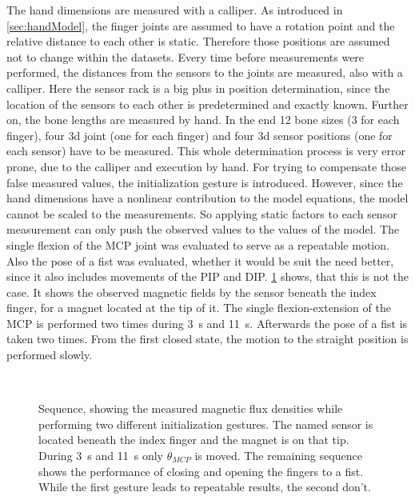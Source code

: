 The hand dimensions are measured with a calliper. As introduced in \ref{sec:handModel}, the finger joints are assumed to have a rotation point and the relative distance to each other is static. Therefore those positions are assumed not to change within the datasets. Every time before measurements were performed, the distances from the sensors to the joints are measured, also with a calliper. Here the sensor rack is a big plus in position determination, since the location of the sensors to each other is predetermined and exactly known. Further on, the bone lengths are measured by hand. In the end 12 bone sizes (3 for each finger), four 3d joint (one for each finger) and four 3d sensor positions (one for each sensor) have to be measured. This whole determination process is very error prone, due to the calliper and execution by hand. For trying to compensate those false measured values, the initialization gesture is introduced. However, since the hand dimensions have a nonlinear contribution to the model equations, the model cannot be scaled to the measurements. So applying static factors to each sensor measurement can only push the observed values to the values of the model. The single flexion of the \ac{MCP} joint was evaluated to serve as a repeatable motion. Also the pose of a fist was evaluated, whether it would be suit the need better, since it also includes movements of the \ac{PIP} and \ac{DIP}. \ref{fig:set1mag} shows, that this is not the case. It shows the observed magnetic fields by the sensor beneath the index finger, for a magnet located at the tip of it. The single flexion-extension of the \ac{MCP} is performed two times during \SI{3}{\second} and \SI{11}{\second}. Afterwards the pose of a fist is taken two times. From the first closed state, the motion to the straight position is performed slowly. 
\begin{figure}
\centering
{}\\
\caption[Measured magnetic flux densities for various initialization gestures]
{Sequence, showing the measured magnetic flux densities while performing two different initialization gestures. The named sensor is located beneath the index finger and the magnet is on that tip. During \SI{3}{\second} and \SI{11}{\second} only $ \theta_{MCP} $ is moved. The remaining sequence shows the performance of closing and opening the fingers to a fist. While the first gesture leads to repeatable results, the second don't.}
\label{fig:set1mag}
\end{figure}
